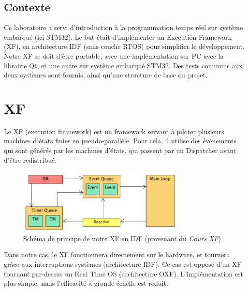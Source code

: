 \begin{summary}
\section{Contexte}
Ce laboratoire a servi d'introduction à la programmation temps réel sur
système embarqué (ici STM32).
Le but était d'implémenter un Execution Framework (XF), en architecture IDF (sans
couche RTOS) pour simplifier le développement.
Notre XF se doit d'être portable, avec une implémentation sur PC avec
la librairie Qt, et une autre sur système embarqué STM32. Des tests communs aux deux
systèmes sont fournis, ainsi qu'une structure de base du projet.
\end{summary}

\section{XF}
Le XF (execution framework) est un framework servant à piloter plusieurs machines
d'états finies en pseudo-parallèle. Pour cela, il utilise des événements qui sont générés
par les machines d'états, qui passent par un Dispatcher avant d'être redistribué.
\begin{figure}[H]
    \centering
    \includegraphics[width=0.75\textwidth]{Images/xf/IDF.PNG}
    \caption[Schéma de principe de notre XF en IDF]{Schéma de principe de notre XF en IDF (provenant du \emph{Cours XF}\footnotemark)}
\end{figure}
Dans notre cas, le XF fonctionnera directement sur le hardware, et tournera grâce
aux interruptions systèmes (architecture IDF). Ce cas est opposé d'un XF tournant
par-dessus un Real Time OS (architecture OXF). L'implémentation est plus simple, mais 
l'efficacité à grande échelle est réduit.

